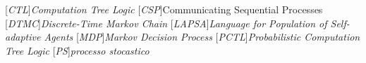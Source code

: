     \chapter*{\acronymname}
    \begin{acronym}[LAPSA]
		[\emph{CTL}]{\emph{Computation Tree Logic}}
		[\emph{CSP}]{Communicating Sequential Processes}
		[\emph{DTMC}]{\emph{Discrete-Time Markov Chain}}
		[\emph{LAPSA}]{\emph{Language for Population of Self-adaptive Agents}}
		[\emph{MDP}]{\emph{Markov Decision Process}}		
		[\emph{PCTL}]{\emph{Probabilistic Computation Tree Logic}}
		[\emph{PS}]{\emph{processo stocastico}}
    \end{acronym}
\endgroup

\cleardoublepage